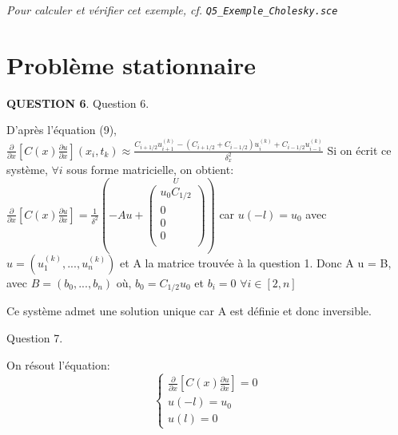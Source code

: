 \documentclass[a4paper,11pt]{article}
\newcommand{\quest}[1]{\small\textbf{#1}\normalsize}
\theoremstyle{nonumberplain}
\theoremstyle{nonumberplain}
\begin{document}
      \begin{ref_scilab}
          \emph{Pour calculer et vérifier cet exemple, cf.} \texttt{\emph{Q5\_Exemple\_Cholesky.sce}}
      \end{ref_scilab}

\section{Problème stationnaire}

    \quest{QUESTION 6}. 
Question 6.

D'après l'équation (9),
\newline
$ \frac{\partial }{\partial x} [C(x)\frac{\partial u }{\partial x}](x_i, t_k) \approx \frac{C_{i+1/2}u_{i+1}^{(k)} - (C_{i+1/2} + C_{i-1/2})u_i^{(k)} + C_{i-1/2}u_{i-1}^{(k)}}{\delta_x^2} $
\newline
Si on écrit ce système, $\forall i $ sous forme matricielle, on obtient:
\newline
$ \frac{\partial }{\partial x} [C(x)\frac{\partial u }{\partial x}] = \frac{1}{\delta ^2} (-A u +
\overset{U} {
    \begin{pmatrix}
        u_0 C_{1/2} \\
        0 \\
        0 \\
        0 \\
    \end{pmatrix}
})$
car $u(-l) = u_0$
avec $u = (u_1^{(k)}, ... , u_n^{(k)}) $
et A la matrice trouvée à la question 1.
\newline
Donc A u = B, avec $B = (b_0, ..., b_n)$
où, $b_0 = C_{1/2} u_0$
et $b_i = 0$  $\forall i \in [2, n] $
\newline

Ce système admet une solution unique car A est définie et donc inversible.
\newline

Question 7.

On résout l'équation:
$$\left\{
\begin{array}{ll}
  \frac{\partial}{\partial x}[C(x)\frac{\partial u}{\partial x}] = 0 \\
  u(-l) = u_0 \\
  u(l) = 0
  \end{array}
\right.
$$
\end{document}
